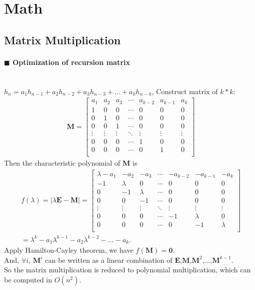 \documentclass[10pt]{article}
\begin{document}
\section{Math}
\subsection{Matrix Multiplication}

\paragraph{$\blacksquare$ Optimization of recursion matrix}
\noindent \\
$h_n=a_1h_{n-1}+a_2h_{n-2}+a_3h_{n-3}+ \ldots + a_kh_{n-k}$, Construct matrix of $k*k$:
\begin{gather*}
\mathbf{M} =
\begin{bmatrix}
a_1 & a_2 & a_3 & \cdots & a_{k-2} & a_{k-1} & a_k \\
1 & 0 & 0 & \cdots & 0 & 0 & 0 \\
0 & 1 & 0 & \cdots & 0 & 0 & 0 \\
0 & 0 & 1 & \cdots & 0 & 0 & 0 \\
\vdots & \vdots & \vdots & \ddots & \vdots & \vdots & \vdots \\
0 & 0 & 0 & \cdots & 1 & 0 & 0 \\
0 & 0 & 0 & \cdots & 0 & 1 & 0 \\
\end{bmatrix}
\end{gather*}
Then the characteristic polynomial of $\mathbf{M}$ is
\begin{gather*}
f(\lambda)=|\lambda \mathbf{E} - \mathbf{M}| =
\begin{bmatrix}
\lambda - a_1 & -a_2 & -a_3 & \cdots & -a_{k-2} & -a_{k-1} & -a_k \\
-1 & \lambda & 0 & \cdots & 0 & 0 & 0 \\
0 & -1 & \lambda & \cdots & 0 & 0 & 0 \\
0 & 0 & -1 & \cdots & 0 & 0 & 0 \\
\vdots & \vdots & \vdots & \ddots & \vdots & \vdots & \vdots \\
0 & 0 & 0 & \cdots & -1 & \lambda & 0 \\
0 & 0 & 0 & \cdots & 0 & -1 & \lambda \\
\end{bmatrix}
\\
=\lambda ^k - a_1 \lambda ^ {k-1} - a_2 \lambda ^ {k-2} - \ldots - a_k.
\end{gather*}
Apply Hamilton-Cayley theorem, we have $f(\mathbf{M})=\mathbf{0}$. \\
And, $\forall i$, $\mathbf{M} ^ i$ can be written as a linear combination of $\mathbf{E}$,$\mathbf{M}$,$\mathbf{M} ^2$,$\ldots$,$\mathbf{M} ^ {k-1}$.\\
So the matrix multiplication is reduced to polynomial multiplication, which can be computed in $O(n^2)$.
\end{document}
